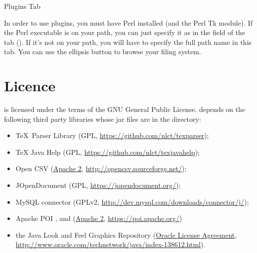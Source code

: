 
 {%
 }
 {Plugins Tab}

In order to use  plugins, you must have Perl installed (and the
Perl Tk module). If the Perl executable is on your path, you can just
specify it as  in the 
field of the  tab (). If it's not on your
path, you will have to specify the full path name in this tab. You can
use the ellipsis button to browse your filing system.

\chapter{Licence}
\label{sec:licence}

    is licensed under the terms of the GNU General Public License.
    depends on the following third party libraries whose jar files are
   in the  directory:
   \begin{itemize}
   \item \TeX\ Parser Library 
   (GPL, \url{https://github.com/nlct/texparser});
   \item TeX Java Help 
   (GPL, \url{https://github.com/nlct/texjavahelp});
   \item Open CSV 
     (\href{https://www.apache.org/licenses/LICENSE-2.0.html}{Apache 2},
      \url{http://opencsv.sourceforge.net/});
   \item JOpenDocument 
     (GPL, \url{https://jopendocument.org/});
   \item MySQL connector 
     (GPLv2, \url{http://dev.mysql.com/downloads/connector/j/});
   \item Apache POI , 
   and 
    (\href{https://www.apache.org/licenses/LICENSE-2.0.html}{Apache 2}, \url{https://poi.apache.org/})
   \item the Java Look and Feel Graphics Repository 
   (\href{https://www.oracle.com/a/tech/docs/software-icon-license-943-2012.html}{Oracle
License Agreement}, 
    \url{http://www.oracle.com/technetwork/java/index-138612.html}).
   \end{itemize}




\printmain
\printindex


